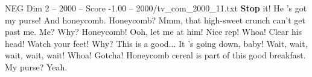\begin{textsample}{NEG Dim 2 – 2000 – Score -1.00 – 2000/tv\_com\_2000\_11.txt}  \label{ex:f2_neg_005}
\textbf{Stop} it!
He 's got my purse!
And honeycomb.
Honeycomb?
Mmm, that high-sweet crunch can't get past me.
Me?
Why?
Honeycomb!
Ooh, let me at him!
Nice rep!
Whoa!
Clear his head!
Watch your feet!
Why?
This is a good...
It 's going down, baby!
Wait, wait, wait, wait, wait!
Whoa!
Gotcha!
Honeycomb cereal is part of this good breakfast.
My purse?
Yeah.

\end{textsample}
